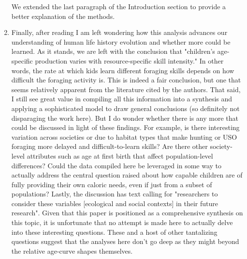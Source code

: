 \documentclass{article}
\newcommand{\rev}[1]{{\color{ForestGreen}#1}}
\begin{document}
\begin{enumerate}
\rev{We extended the last paragraph of the Introduction section to provide a better explanation of the methods.}

    \item Finally, after reading I am left wondering how this analysis advances our understanding of  human life history evolution and whether more could be learned. As it stands, we are left with  the conclusion that "children's age-specific production varies with resource-specific skill intensity." In other words, the rate at which kids learn different foraging skills depends on how  difficult the foraging activity is. This is indeed a fair conclusion, but one that seems relatively  apparent from the literature cited by the authors. That said, I still see great value in compiling all this information into a synthesis and applying a  sophisticated model to draw general conclusions (so definitely not disparaging the work here).  But I do wonder whether there is any more that could be discussed in light of these findings. For  example, is there interesting variation across societies or due to habitat types that make hunting  or USO foraging more delayed and difficult-to-learn skills? Are there other society-level attributes such as age at first birth that affect population-level differences? Could the data  compiled here be leveraged in some way to actually address the central question raised about how capable children are of fully providing their own caloric needs, even if just from a subset of  populations? Lastly, the discussion has text calling for "researchers to consider these variables [ecological and social contexts] in their future research". Given that this paper is positioned as a  comprehensive synthesis on this topic, it is unfortunate that no attempt is made here to actually  delve into these interesting questions. These and a host of other tantalizing questions suggest that the analyses here don't go deep as they might beyond the relative age-curve shapes themselves.


\end{enumerate}
\end{document}
